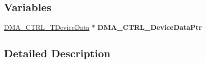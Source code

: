 \subsection*{Variables}
\begin{DoxyCompactItemize}
\item 
\hypertarget{group___d_m_a___c_t_r_l__module_ga437a5df61b265b71713b028b2fe4927d}{\hyperlink{struct_d_m_a___c_t_r_l___t_device_data}{D\-M\-A\-\_\-\-C\-T\-R\-L\-\_\-\-T\-Device\-Data} $\ast$ {\bfseries D\-M\-A\-\_\-\-C\-T\-R\-L\-\_\-\-Device\-Data\-Ptr}}\label{group___d_m_a___c_t_r_l__module_ga437a5df61b265b71713b028b2fe4927d}

\end{DoxyCompactItemize}


\subsection{Detailed Description}


